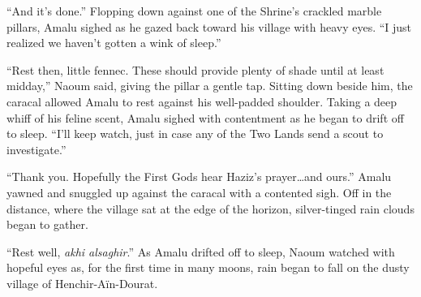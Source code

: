 ``And it's done.'' Flopping down against one of the Shrine's crackled marble pillars, Amalu sighed as he gazed back toward his village with heavy eyes. ``I just realized we haven't gotten a wink of sleep.''

``Rest then, little fennec. These should provide plenty of shade until at least midday,'' Naoum said, giving the pillar a gentle tap. Sitting down beside him, the caracal allowed Amalu to rest against his well-padded shoulder. Taking a deep whiff of his feline scent, Amalu sighed with contentment as he began to drift off to sleep. ``I'll keep watch, just in case any of the Two Lands send a scout to investigate.''

``Thank you. Hopefully the First Gods hear Haziz's prayer\ldots{}and ours.'' Amalu yawned and snuggled up against the caracal with a contented sigh. Off in the distance, where the village sat at the edge of the horizon, silver-tinged rain clouds began to gather.

``Rest well, \emph{akhi alsaghir}.'' As Amalu drifted off to sleep, Naoum watched with hopeful eyes as, for the first time in many moons, rain began to fall on the dusty village of Henchir-Aïn-Dourat.
